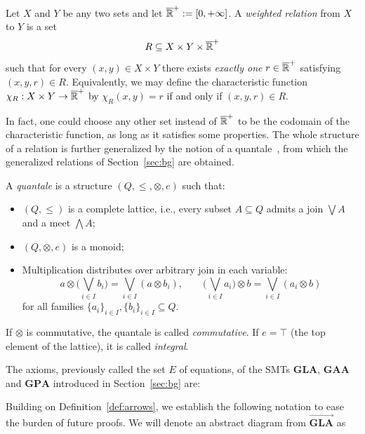 \begin{definition}
	Let $X$ and $Y$ be any two sets and let $\overline{\mathbb{R}}^+:= [0, +\infty]$.
	A \emph{weighted relation} from $X$ to $Y$ is a set
	\[
		R \subseteq X \times Y \times \overline{\mathbb{R}}^+
	\]
	such that for every $(x,y) \in X \times Y$ there exists \emph{exactly one}
	$r \in \overline{\mathbb{R}}^+$ satisfying $(x,y,r) \in R$.
	Equivalently, we may define the characteristic function
	$\chi_R : X \times Y \to \overline{\mathbb{R}}^+$
	by $\chi_R(x,y) = r$ if and only if $(x,y,r) \in R$.
\end{definition}

In fact, one could choose any other set instead of $\overline{\mathbb{R}}^+$ to be the codomain of the characteristic function, as long as it satisfies some properties. The whole structure of a relation is further generalized by the notion of a quantale~\cite{rosenthal1990quantales}, from which the generalized relations of Section~\ref{sec:bg} are obtained.
\begin{definition}[Quantale]
	A \emph{quantale} is a structure $(Q,\leq,\otimes,e)$ such that:
	\begin{itemize}
		\item $(Q,\leq)$ is a complete lattice, i.e., every subset $A \subseteq Q$ admits a join $\bigvee A$ and a meet $\bigwedge A$;
		\item $(Q,\otimes,e)$ is a monoid;
		\item Multiplication distributes over arbitrary join in each variable:
		      \[
			      a \otimes \Big( \bigvee_{i \in I} b_i \Big)
			      =
			      \bigvee_{i \in I} (a \otimes b_i),
			      \qquad
			      \Big( \bigvee_{i \in I} a_i \Big) \otimes b
			      =
			      \bigvee_{i \in I} (a_i \otimes b)
		      \]
		      for all families $\{a_i\}_{i\in I}, \{b_i\}_{i\in I} \subseteq Q$.
	\end{itemize}
	If $\otimes$ is commutative, the quantale is called \emph{commutative}.
	If $e = \top$ (the top element of the lattice), it is called \emph{integral}.
\end{definition}

The axioms, previously called the set $E$ of equations, of the SMTs
$\textbf{GLA}$, $\textbf{GAA}$ and $\textbf{GPA}$ introduced in
Section~\ref{sec:bg} are:

\begingroup

\endgroup

Building on Definition~\ref{def:arrows}, we establish the following notation to ease the
burden of future proofs. We will denote an abstract diagram from $\overrightarrow{\textbf{GLA}}$ as

